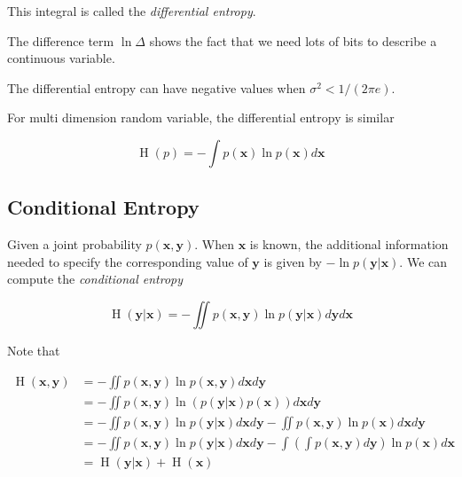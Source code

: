 \documentclass{article}
\begin{document}
            This integral is called the \textit{differential entropy}.

            The difference term $ \ln \Delta $ shows the fact that we need lots of bits to
            describe a continuous variable.

            The differential entropy can have negative values when $ \sigma^2 < 1 / (2 \pi e) $.

            For multi dimension random variable, the differential entropy is similar

            \begin{equation*}
                \operatorname{H}(p) = - \int p(\mathbf{x}) \ln p(\mathbf{x}) d \mathbf{x} 
            \end{equation*}

        \subsection{Conditional Entropy}

            Given a joint probability $ p(\mathbf{x}, \mathbf{y}) $. When $
            \mathbf{x} $ is known, the additional information needed to specify
            the corresponding value of $ \mathbf{y} $ is given by $ - \ln
            p(\mathbf{y} | \mathbf{x}) $. We can compute the
            \textit{conditional entropy}

            \begin{equation*}
                \operatorname{H}(\mathbf{y} | \mathbf{x}) = 
                 - \iint p(\mathbf{x}, \mathbf{y})
                    \ln p( \mathbf{y} | \mathbf{x} ) d \mathbf{y} d \mathbf{x}
            \end{equation*}

            Note that

            \begin{align*}
                \operatorname{H}(\mathbf{x}, \mathbf{y})
                      &= - \iint p(\mathbf{x}, \mathbf{y})
                         \ln p(\mathbf{x}, \mathbf{y}) d \mathbf{x} d \mathbf{y}                    \\
                      &= - \iint p(\mathbf{x}, \mathbf{y}) 
                         \ln ( p(\mathbf{y} | \mathbf{x}) p(\mathbf{x})) d \mathbf{x} d \mathbf{y}  \\
                      &= - \iint p(\mathbf{x}, \mathbf{y}) \ln p(\mathbf{y} | \mathbf{x})
                        d \mathbf{x} d \mathbf{y} -
                        \iint p(\mathbf{x}, \mathbf{y}) \ln p(\mathbf{x}) d \mathbf{x} d \mathbf{y} \\
                      &= - \iint p(\mathbf{x}, \mathbf{y}) \ln p(\mathbf{y} | \mathbf{x}) d \mathbf{x}
                          d \mathbf{y} - \int \left( \int p(\mathbf{x}, \mathbf{y}) d \mathbf{y} \right)
                          \ln p(\mathbf{x}) d \mathbf{x}                                            \\
                      &= \operatorname{H} (\mathbf{y} | \mathbf{x}) + \operatorname{H} (\mathbf{x})
            \end{align*}
\end{document}

